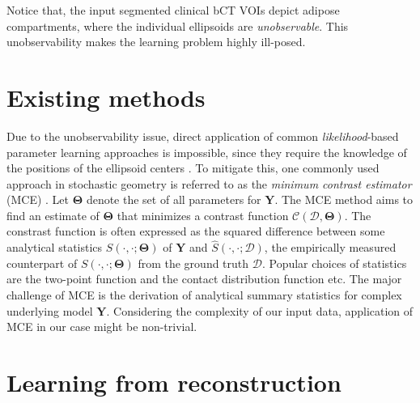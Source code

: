 \documentclass[journal]{IEEEtran}
\begin{document}
Notice that, the input segmented clinical bCT VOIs depict adipose
compartments, where the individual ellipsoids are
\textit{unobservable}. This unobservability makes the learning problem
highly ill-posed.

\section{Existing methods}
\label{sec:exist-param-infer}

Due to the unobservability issue, direct application of common
\textit{likelihood}-based parameter learning approaches
\cite{moller2003statistical} is impossible, since they require the
knowledge of the positions of the ellipsoid centers
\cite{dereudre2014estimation}. To mitigate this, one commonly used
approach in stochastic geometry is referred to as the \textit{minimum
  contrast estimator} (MCE) \cite{chiu2013stochastic}. Let
$\mathbf{\Theta}$ denote the set of all parameters for
$\mathbf{Y}$. The MCE method aims to find an estimate of
$\mathbf{\Theta}$ that minimizes a contrast function
$\mathcal{C}(\mathcal{D}, \mathbf{\Theta})$. The constrast function is
often expressed as the squared difference between some analytical
statistics $S(\cdot, \cdot; \mathbf{\Theta})$ of $\mathbf{Y}$ and
$\hat{S}(\cdot, \cdot; \mathcal{D})$, the empirically measured
counterpart of $S(\cdot, \cdot; \mathbf{\Theta})$ from the ground
truth $\mathcal{D}$. Popular choices of statistics are the two-point
function \cite{diggle1981binary} and the contact distribution function
\cite {heinrich1993asymptotic} etc. The major challenge of MCE is the
derivation of analytical summary statistics for complex underlying
model $\mathbf{Y}$. Considering the complexity of our input data,
application of MCE in our case might be non-trivial.

\section{Learning from reconstruction}
\label{sec:meth-infer-from}
\end{document}
